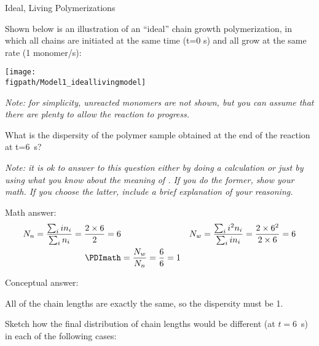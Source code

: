 \begin{activity}{Ideal, Living Polymerizations}
\begin{instructornotes}
\end{instructornotes}


\begin{model}
	\label{\labelbase:mdl:idealliving}

	Shown below is an illustration of an ``ideal'' chain growth polymerization, in which all chains are initiated at the same time (t=0 s) and all grow at the same rate (1 monomer/s):
	    
	    \vspace{6pt}
	    	\centerline{\texttt{[image: \\figpath/Model1\_ideallivingmodel]}}
	    	
	    	\emph{Note: for simplicity, unreacted monomers are not shown, but you can assume that there are plenty to allow the reaction to progress.}
	
\end{model}


\begin{ctqs}

	\question What is the dispersity of the polymer sample obtained at the end of the reaction at t=6~s?
		
				\emph{Note: it is ok to answer to this question either by doing a calculation or just by using what you know about the meaning of \PDItext.  If you do the former, show your math. If you choose the latter, include a brief explanation of your reasoning.}
			
				\begin{solution}[1.5in]
				
					Math answer:
						\begin{align*}
							N_n = \frac{\sum_i i n_i}{\sum_i n_i} = \frac{2\times 6}{2} = 6 &&&
							N_w = \frac{\sum_i i^2 n_i}{\sum_i i n_i} = \frac{2\times 6^2}{2\times 6} = 6\\
							\PDImath &= \frac{N_w}{N_n} = \frac{6}{6} = 1
						\end{align*}
					
					Conceptual answer:
					
						All of the chain lengths are exactly the same, so the dispersity must be 1.
						
				\end{solution}

	\question Sketch how the final distribution of chain lengths would be different (at $t=6$~s) in each of the following cases:

		\begin{enumerate}


\end{enumerate}
\end{ctqs}
\end{activity}
